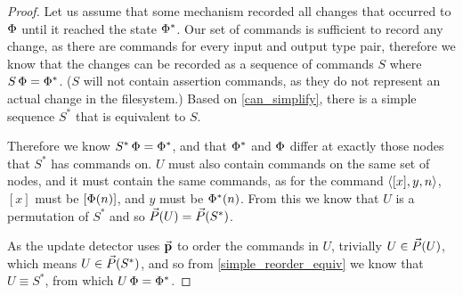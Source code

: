 \begin{proof}
Let us assume that some mechanism recorded all changes that occurred
to $\Phi$ until it reached the state $\Phi^*$.
Our set of commands is sufficient to record any change, as
there are commands for every input and output type pair, therefore
we know that the changes can be recorded as a sequence of commands $S$
where $S\,\Phi=\Phi^*$.
($S$ will not contain assertion commands, as they do not
represent an actual change in the filesystem.)
Based on \cref{can_simplify}, there is a simple sequence $S^*$
that is equivalent to $S$.

Therefore we know $S^*\,\Phi=\Phi^*$, and that
$\Phi^*$ and $\Phi$ differ at exactly those nodes that $S^*$ has commands on.
$U$ must also contain commands on the same set of nodes,
and it must contain the same commands,
as for the command $\langle{[x],y,n}\rangle$, $[x]$ must be $[\Phi(n)]$, and $y$ must be $\Phi^*(n)$.
From this we know that $U$ is a permutation of $S^*$ and so $\vec{P}({U})=\vec{P}({S^*})$.

As the update detector uses $\mathrel{\vec{\mathbf{p}}}$ to order the commands in $U$, trivially $U\in\vec{P}({U})$,
which means $U\in\vec{P}({S^*})$,
and so from \cref{simple_reorder_equiv} we know that $U\equiv S^*$,
from which $U\,\Phi=\Phi^*$.
\end{proof}
